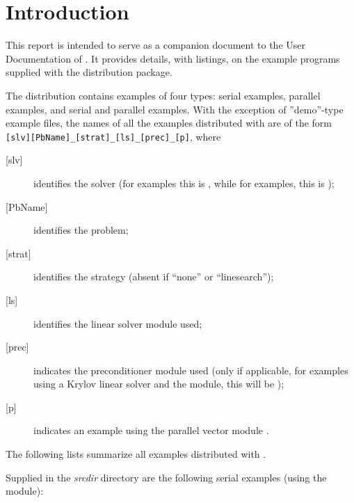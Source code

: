 \section{Introduction}\label{s:ex_intro}

This report is intended to serve as a companion document to the User
Documentation of {\kinsol} \cite{kinsol_ug}.  It provides details, with
listings, on the example programs supplied with the {\kinsol} distribution
package.

The {\kinsol} distribution contains examples of four types: serial
{\CC} examples, parallel {\CC} examples, and serial and parallel {\F}
examples.
With the exception of ''demo''-type example files, the names of all the examples 
distributed with {\sundials} are of the form
\verb![slv][PbName]_[strat]_[ls]_[prec]_[p]!, where
\begin{description}
\item [{[slv]}] identifies the solver (for {\kinsol} examples this is , 
  while for {\fkinsol} examples, this is );
\item [{[PbName]}] identifies the problem;
\item [{[strat]}] identifies the strategy (absent if ``none'' or ``linesearch'');
\item [{[ls]}] identifies the linear solver module used;
\item [{[prec]}] indicates the {\kinsol} preconditioner module used
  (only if applicable, for examples using a Krylov linear solver
  and the {\kinbbdpre} module, this will be );
\item [{[p]}] indicates an example using the parallel vector module {\nvecp}.
\end{description}

\vspace{0.2in}\noindent
The following lists summarize all examples distributed with {\kinsol}.

\vspace{0.2in}\noindent
Supplied in the {\em srcdir} directory are the
following serial examples (using the {\nvecs} module):

